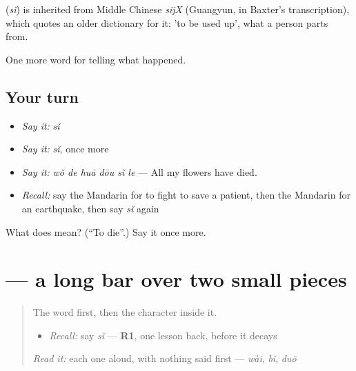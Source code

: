 \begin{cousinweb}
\textbf{} (\emph{sǐ}) is inherited from Middle Chinese \emph{sijX} (Guangyun, in Baxter's transcription), which quotes an older dictionary for it: 'to be used up', what a person parts from.
\end{cousinweb}

\begin{grammarlens}[title={What you've built}]
One more word for telling what happened.
\end{grammarlens}

\subsection*{Your turn}
\begin{itemize}
\raggedright
  \item \emph{Say it:} \emph{sǐ}
  \item \emph{Say it:} \emph{sǐ}, once more
  \item \emph{Say it:} \emph{wǒ de huā dōu sǐ le} — All my flowers have died.
  \item \emph{Recall:} say the Mandarin for to fight to save a patient, then the Mandarin for an earthquake, then say \emph{sǐ} again
\end{itemize}

\begin{tcolorbox}[breakable,colback=teal!4,colframe=teal!35!black,title={Before you move on}]
What does  mean? (\textquotedblleft{}To die\textquotedblright{}.) Say it once more.
\end{tcolorbox}
\section[\texorpdfstring{\zh{死} (sǐ)}{死 (sǐ)}]{ — a long bar over two small pieces}

\label{lesson:ZH-W300-si-die}



\begin{quote}
The word first, then the character inside it.

\begin{itemize}
\raggedright
  \item \emph{Recall:} say \emph{sǐ} — \textbf{R1}, one lesson back, before it decays
\end{itemize}

\begin{quote}
  
\end{quote}

\emph{Read it:} each one aloud, with nothing said first — \emph{wài}, \emph{bǐ}, \emph{duō}
\end{quote}

